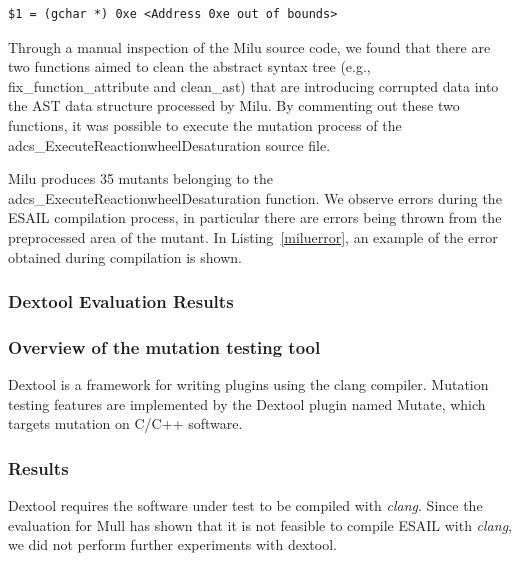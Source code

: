 \noindent\begin{minipage}{0.8\textwidth}
\begin{lstlisting}[language={}]
$1 = (gchar *) 0xe <Address 0xe out of bounds>
\end{lstlisting}
\end{minipage}

Through a manual inspection of the Milu source code, we found that there are two functions aimed to clean the abstract syntax tree (e.g., fix\_function\_attribute and clean\_ast) that are introducing corrupted data into the AST data structure processed by Milu.
By commenting out these two functions, it was possible to execute the mutation process of the adcs\_ExecuteReactionwheelDesaturation source file. 

Milu produces 35 mutants belonging to the adcs\_ExecuteReactionwheelDesaturation function.
 We observe errors during the ESAIL compilation process, in particular there are errors being thrown from the preprocessed area of the mutant. In Listing~\ref{miluerror}, an example of the error obtained during compilation is shown.



\subsubsection{Dextool Evaluation Results}
\label{subsec:dextool}

\subsubsection{Overview of the mutation testing tool}

Dextool is a framework for writing plugins using the clang compiler. Mutation testing features are implemented by the Dextool plugin named Mutate, which targets mutation on C/C++ software.

\subsubsection{Results}

Dextool requires the software under test to be compiled with \emph{clang}.
Since the evaluation for Mull has shown that it is not feasible to compile ESAIL with \emph{clang}, we did not perform further experiments with dextool.



